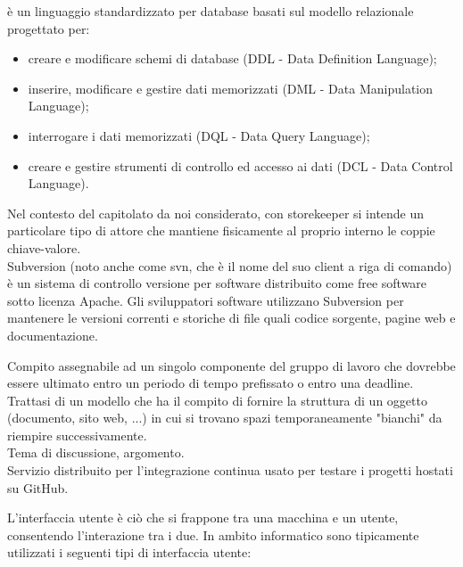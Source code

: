 \documentclass{scalatekids-article}
\begin{document}
   è un linguaggio standardizzato per database basati sul modello relazionale progettato per: 
  \begin{itemize}
  	\item creare e modificare schemi di database (DDL - Data Definition Language);
  	\item inserire, modificare e gestire dati memorizzati (DML - Data Manipulation Language);
  	\item interrogare i dati memorizzati (DQL - Data Query Language);
  	\item creare e gestire strumenti di controllo ed accesso ai dati (DCL - Data Control Language).
  \end{itemize}
  
   Nel contesto del capitolato da noi considerato, con storekeeper si intende un particolare tipo di attore che mantiene fisicamente al proprio interno le coppie chiave-valore.
  \\

   Subversion (noto anche come svn, che è il nome del suo client a riga di comando) è un sistema di controllo versione per software distribuito come free software sotto licenza Apache.
  Gli sviluppatori software utilizzano Subversion per mantenere le versioni correnti e storiche di file quali codice sorgente, pagine web e documentazione.
  \\


  \label{sec:task} Compito assegnabile ad un singolo componente del gruppo di lavoro che dovrebbe essere ultimato entro un periodo di tempo prefissato o entro una deadline.
  \\

   Trattasi di un modello che ha il compito di fornire la struttura di un oggetto (documento, sito web, ...) in cui si trovano spazi temporaneamente "bianchi" da riempire successivamente.
  \\

   Tema di discussione, argomento.
  \\

   Servizio distribuito per l'integrazione continua usato per testare i progetti hostati su GitHub.
  \\


   L'interfaccia utente è ciò che si frappone tra una macchina e un utente, consentendo l'interazione tra i due. In ambito informatico sono tipicamente utilizzati i seguenti tipi di interfaccia utente:
\end{document}
